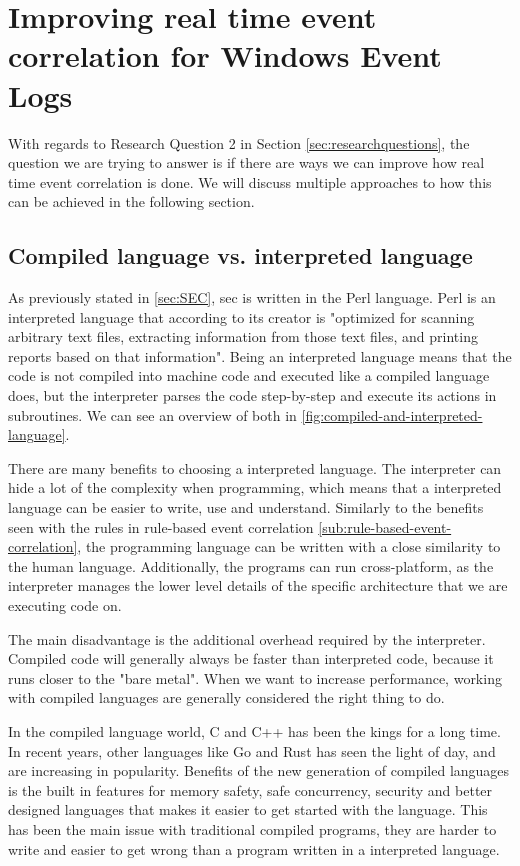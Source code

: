 \section{Improving real time event correlation for Windows Event Logs}
\label{sec:improving-real-time-event-correlation-for-windows-event-logs}

With regards to Research Question 2 in Section \cref{sec:researchquestions}, the question we are trying to answer is if there are ways we can improve how real time event correlation is done. We will discuss multiple approaches to how this can be achieved in the following section.

\subsection{Compiled language vs. interpreted language}
\label{sub:use-compiled-language}


As previously stated in \cref{sec:SEC}, \acrshort{sec} is written in the Perl language. Perl is an interpreted language that according to its creator \textcite{wall1994perl} is "optimized for scanning arbitrary text files, extracting information from those text files, and printing reports based on that information". Being an interpreted language means that the code is not compiled into machine code and executed like a compiled language does, but the interpreter parses the code step-by-step and execute its actions in subroutines. We can see an overview of both in \cref{fig:compiled-and-interpreted-language}.


There are many benefits to choosing a interpreted language. The interpreter can hide a lot of the complexity when programming, which means that a interpreted language can be easier to write, use and understand. Similarly to the benefits seen with the rules in rule-based event correlation \cref{sub:rule-based-event-correlation}, the programming language can be written with a close similarity to the human language. Additionally, the programs can run cross-platform, as the interpreter manages the lower level details of the specific architecture that we are executing code on.

The main disadvantage is the additional overhead required by the interpreter. Compiled code will generally always be faster than interpreted code, because it runs closer to the "bare metal". When we want to increase performance, working with compiled languages are generally considered the right thing to do.

In the compiled language world, C and C++ has been the kings for a long time. In recent years, other languages like Go \cite{golang} and Rust \cite{Rust} has seen the light of day, and are increasing in popularity. Benefits of the new generation of compiled languages is the built in features for memory safety, safe concurrency, security and better designed languages that makes it easier to get started with the language. This has been the main issue with traditional compiled programs, they are harder to write and easier to get wrong than a program written in a interpreted language.

